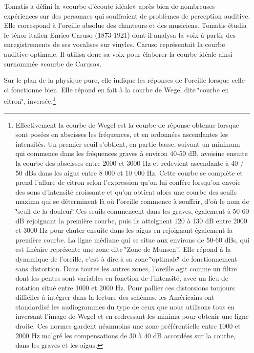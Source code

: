 Tomatis a défini la «courbe d\textquoteright écoute idéale» après
bien de nombreuses expériences sur des personnes qui souffraient de
problèmes de perception auditive. Elle correspond à l'oreille absolue
des chanteurs et des musiciens. Tomatis étudia le ténor italien Enrico
Caruso (1873-1921) dont il analysa la voix à partir des enregistrements
de ses vocalises sur vinyles. Caruso représentait la courbe auditive
optimale. Il utilisa donc sa voix pour élaborer la courbe idéale ainsi
surnommée «courbe de Caruso».

Sur le plan de la physique pure, elle indique les réponses de l'oreille
lorsque celle-ci fonctionne bien. Elle répond en fait à la courbe
de Wegel dite \char`\"{}courbe en citron\char`\"{}, inversée.\footnote{Effectivement la courbe de Wegel est la courbe de réponse obtenue
lorsque sont posées en abscisses les fréquences, et en ordonnées ascendantes
les intensités. Un premier seuil s'obtient, en partie basse, suivant
un minimum qui commence dans les fréquences graves à environ 40-50
dB, avoisine ensuite la courbe des abscisses entre 2000 et 3000 Hz
et redevient ascendante à 40 / 50 dBs dans les aigus entre 8 000 et
10 000 Hz. Cette courbe se complète et prend l'allure de citron selon
l'expression qu'on lui confére lorsqu\textquoteright on envoie des
sons d'intensité croissante et qu'on obtient alors une courbe des
seuils maxima qui se déterminent là où l'oreille commence à souffrir,
d'où le nom de \char`\"{}seuil de la douleur\char`\"{}.Ces seuils
commencent dans les graves, également à 50-60 dB rejoignant la première
courbe, puis ils atteignent 120 à 130 dB entre 2000 et 3000 Hz pour
chuter ensuite dans les aigus en rejoignant également la première
courbe. La ligne médiane qui se situe aux environs de 50-60 dBs, qui
est linéaire représente une zone dite \char`\"{}Zone de Munsen''.
Elle répond à la dynamique de l\textquoteright oreille, c\textquoteright est
à dire à sa zone \char`\"{}optimale\char`\"{} de fonctionnement sans
distortion. Dans toutes les autres zones, l\textquoteright oreille
agit comme un filtre dont les pentes sont variables en fonction de
l\textquoteright intensité, avec un lieu de rotation situé entre 1000
et 2000 Hz. Pour pallier ces distorsions toujours difficiles à intégrer
dans la lecture des schémas, les Américains ont standardisé les audiogrammes
du type de ceux que nous utilisons tous en inversant l\textquoteright image
de Wegel et en redressant les minima pour obtenir une ligne droite.
Ces normes gardent néanmoins une zone préférentielle entre 1000 et
2000 Hz malgré les compensations de 30 à 40 dB accordées sur la courbe,
dans les graves et les aigus.}

